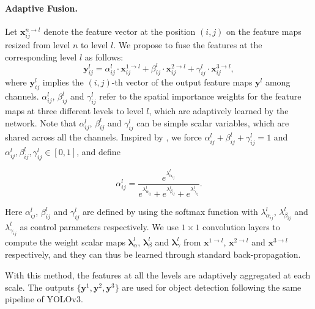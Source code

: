 \documentclass[10pt,twocolumn,letterpaper]{article}
\begin{document}
\paragraph{Adaptive Fusion.} Let $\mathbf{x}_{ij}^{n\rightarrow l}$ denote the feature vector at the position $(i,j)$ on the feature maps resized from level $n$ to level $l$. We propose to fuse the features at the corresponding level $l$ as follows:
\begin{equation}
\label{eq:1}
\mathbf{y}_{ij}^l = \alpha^l_{ij} \cdot \mathbf{x}_{ij}^{1\rightarrow l} + \beta^l_{ij} \cdot \mathbf{x}_{ij}^{2\rightarrow l} +\gamma^l_{ij} \cdot \mathbf{x}_{ij}^{3\rightarrow l},
\end{equation}
where $\mathbf{y}_{ij}^l$ implies the $(i,j)$-th vector of the output feature maps $\mathbf{y}^l$ among channels. $\alpha^l_{ij}$, $\beta^l_{ij}$ and $\gamma^l_{ij}$ refer to the spatial importance weights for the feature maps at three different levels to level $l$, which are adaptively learned by the network. Note that $\alpha^l_{ij}$, $\beta^l_{ij}$ and $\gamma^l_{ij}$ can be simple scalar variables, which are shared across all the channels. Inspired by \cite{acnet}, we force $\alpha^l_{ij}+\beta^l_{ij}+\gamma^l_{ij}=1$ and $\alpha^l_{ij},\beta^l_{ij},\gamma^l_{ij} \in [0,1]$, and define
\begin{small}\begin{equation}
	\alpha^l_{ij} = \frac{e^{\lambda^l_{\alpha_{ij}}}}{e^{\lambda^l_{\alpha_{ij}}} + e^{\lambda^l_{\beta_{ij}
		}} + e^{\lambda^l_{\gamma_{ij}}}}.
	\end{equation}\end{small}
Here $\alpha^l_{ij}$, $\beta^l_{ij}$ and $\gamma^l_{ij}$ are defined by using the softmax function with $\lambda^l_{\alpha_{ij}}$, $\lambda^l_{\beta_{ij}}$ and $\lambda^l_{\gamma_{ij}}$ as control parameters respectively. We use $1\times1$ convolution layers to compute the weight scalar maps $\mathbf{\lambda}^l_\alpha$, $\mathbf{\lambda}^l_\beta$ and $\mathbf{\lambda}^l_\gamma$ from $\mathbf{x}^{1\rightarrow l}$, $\mathbf{x}^{2\rightarrow l}$ and $\mathbf{x}^{3\rightarrow l}$ respectively, and they can thus be learned through standard back-propagation.

With this method, the features at all the levels are adaptively aggregated at each scale. The outputs $\{\mathbf{y}^1,\mathbf{y}^2,\mathbf{y}^3\}$ are used for object detection following the same pipeline of YOLOv3.
\end{document}
